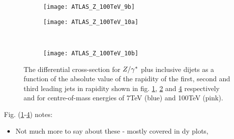 	\begin{figure}[h]
		\centering
		\begin{subfigure}[b]{0.48\textwidth}
			\texttt{[image: ATLAS\_Z\_100TeV\_9b]}
			\caption{}
			\label{fig:100tev_9b}
		\end{subfigure}

		\begin{subfigure}[b]{0.48\textwidth}
			\texttt{[image: ATLAS\_Z\_100TeV\_10a]}
			\caption{}
			\label{fig:100tev_10a}
		\end{subfigure}
		~
		\begin{subfigure}[b]{0.48\textwidth}
			\texttt{[image: ATLAS\_Z\_100TeV\_10b]}
			\caption{}
			\label{fig:100tev_10b}
		\end{subfigure}
		\caption{The differential cross-section for $Z/\gamma^*$ plus inclusive dijets as a function of the absolute value of the rapidity
		         of the first, second and third leading jets in rapidity shown in fig. \ref{fig:100tev_9b}, \ref{fig:100tev_10a}
		         and \ref{fig:100tev_10b} respectively and for centre-of-mass energies of 7TeV (blue) and 100TeV (pink).}
	\end{figure}

	Fig. (\ref{fig:100tev_9b}-\ref{fig:100tev_10b}) notes:

	\begin{itemize}
		\item Not much more to say about these - mostly covered in dy plots,
	\end{itemize}

